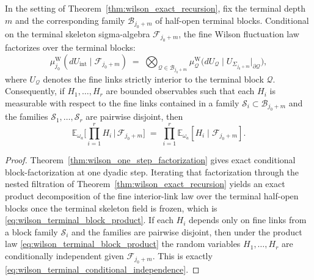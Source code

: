 \begin{corollary}\label{cor:wilson_terminal_block_product}
In the setting of Theorem~\ref{thm:wilson_exact_recursion}, fix the terminal depth $m$ and the corresponding family $\mathcal B_{j_0+m}$ of half-open terminal blocks.
Conditional on the terminal skeleton sigma-algebra $\mathcal F_{j_0+m}$, the fine Wilson fluctuation law factorizes over the terminal blocks:
\begin{equation}\label{eq:wilson_terminal_block_product}
\mu^{\mathrm W}_{j_0}(dU_{\mathrm{int}}\mid \mathcal F_{j_0+m})
\;=\;
\bigotimes_{\mathcal Q\in\mathcal B_{j_0+m}} \mu^{\mathrm W}_{\mathcal Q}\bigl(dU_{\mathcal Q}\mid U_{\Sigma_{j_0+m}}|_{\partial \mathcal Q}\bigr),
\end{equation}
where $U_{\mathcal Q}$ denotes the fine links strictly interior to the terminal block $\mathcal Q$.
Consequently, if $H_1,\dots,H_r$ are bounded observables such that each $H_i$ is measurable with respect to the fine links contained in a family $\mathscr S_i\subset \mathcal B_{j_0+m}$ and the families $\mathscr S_1,\dots,\mathscr S_r$ are pairwise disjoint, then
\begin{equation}\label{eq:wilson_terminal_conditional_independence}
\mathbb E_{\omega_a}\!\Big[\prod_{i=1}^r H_i\,\Big|\,\mathcal F_{j_0+m}\Big]
\;=\;
\prod_{i=1}^r \mathbb E_{\omega_a}[H_i\mid \mathcal F_{j_0+m}].
\end{equation}
\end{corollary}

\begin{proof}
Theorem~\ref{thm:wilson_one_step_factorization} gives exact conditional block-factorization at one dyadic step.
Iterating that factorization through the nested filtration of Theorem~\ref{thm:wilson_exact_recursion} yields an exact product decomposition of the fine interior-link law over the terminal half-open blocks once the terminal skeleton field is frozen, which is \eqref{eq:wilson_terminal_block_product}.
If each $H_i$ depends only on fine links from a block family $\mathscr S_i$ and the families are pairwise disjoint, then under the product law \eqref{eq:wilson_terminal_block_product} the random variables $H_1,\dots,H_r$ are conditionally independent given $\mathcal F_{j_0+m}$.
This is exactly \eqref{eq:wilson_terminal_conditional_independence}.
\end{proof}

